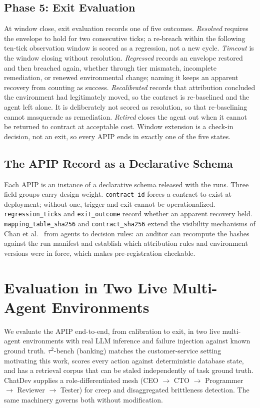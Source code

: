 \documentclass[conference]{IEEEtran}
\begin{document}
\subsection{Phase 5: Exit Evaluation}

At window close, exit evaluation records one of five outcomes. \emph{Resolved} requires the envelope to hold for two consecutive ticks; a re-breach within the following ten-tick observation window is scored as a regression, not a new cycle. \emph{Timeout} is the window closing without resolution. \emph{Regressed} records an envelope restored and then breached again, whether through tier mismatch, incomplete remediation, or renewed environmental change; naming it keeps an apparent recovery from counting as success. \emph{Recalibrated} records that attribution concluded the environment had legitimately moved, so the contract is re-baselined and the agent left alone. It is deliberately not scored as resolution, so that re-baselining cannot masquerade as remediation. \emph{Retired} closes the agent out when it cannot be returned to contract at acceptable cost. Window extension is a check-in decision, not an exit, so every APIP ends in exactly one of the five states.

\subsection{The APIP Record as a Declarative Schema}

Each APIP is an instance of a declarative schema released with the runs. Three field groups carry design weight. \texttt{contract\_id} forces a contract to exist at deployment; without one, trigger and exit cannot be operationalized. \texttt{regression\_ticks} and \texttt{exit\_outcome} record whether an apparent recovery held. \texttt{mapping\_table\_sha256} and \texttt{contract\_sha256} extend the visibility mechanisms of Chan et al.~\cite{ref14} from agents to decision rules: an auditor can recompute the hashes against the run manifest and establish which attribution rules and environment versions were in force, which makes pre-registration checkable.

\section{Evaluation in Two Live Multi-Agent Environments}

We evaluate the APIP end-to-end, from calibration to exit, in two live multi-agent environments with real LLM inference and failure injection against known ground truth. $\tau^2$-bench (banking) \cite{ref18} matches the customer-service setting motivating this work, scores every action against deterministic database state, and has a retrieval corpus that can be staled independently of task ground truth. ChatDev \cite{ref19} supplies a role-differentiated mesh (CEO $\rightarrow$ CTO $\rightarrow$ Programmer $\rightarrow$ Reviewer $\rightarrow$ Tester) for creep and disaggregated brittleness detection. The same machinery governs both without modification.
\end{document}
